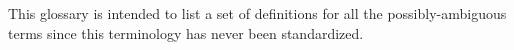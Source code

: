 This glossary is intended to list a set of definitions for all the possibly-ambiguous terms since this terminology has never been standardized.